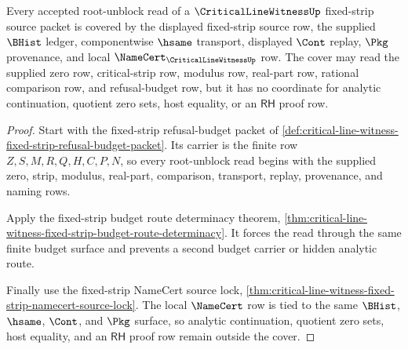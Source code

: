 \begin{theorem}
\label{thm:critical-line-witness-fixed-strip-source-refusal-cover}
Every accepted root-unblock read of a $\CriticalLineWitnessUp$ fixed-strip source packet is covered by the displayed fixed-strip source row, the supplied $\BHist$ ledger, componentwise $\hsame$ transport, displayed $\Cont$ replay, $\Pkg$ provenance, and local $\NameCert_{\CriticalLineWitnessUp}$ row. The cover may read the supplied zero row, critical-strip row, modulus row, real-part row, rational comparison row, and refusal-budget row, but it has no coordinate for analytic continuation, quotient zero sets, host equality, or an $\mathsf{RH}$ proof row.
\end{theorem}
\begin{proof}
Start with the fixed-strip refusal-budget packet of \autoref{def:critical-line-witness-fixed-strip-refusal-budget-packet}. Its carrier is the finite row $Z,S,M,R,Q,H,C,P,N$, so every root-unblock read begins with the supplied zero, strip, modulus, real-part, comparison, transport, replay, provenance, and naming rows.

Apply the fixed-strip budget route determinacy theorem, \autoref{thm:critical-line-witness-fixed-strip-budget-route-determinacy}. It forces the read through the same finite budget surface and prevents a second budget carrier or hidden analytic route.

Finally use the fixed-strip NameCert source lock, \autoref{thm:critical-line-witness-fixed-strip-namecert-source-lock}. The local $\NameCert$ row is tied to the same $\BHist$, $\hsame$, $\Cont$, and $\Pkg$ surface, so analytic continuation, quotient zero sets, host equality, and an $\mathsf{RH}$ proof row remain outside the cover.
\end{proof}

